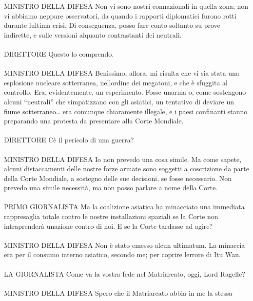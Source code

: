 MINISTRO DELLA DIFESA Non vi sono nostri connazionali in quella zona;
non vi abbiamo neppure osservatori, da quando i rapporti diplomatici
furono rotti durante l\textquotesingle ultima crisi. Di conseguenza,
posso fare conto soltanto su prove indirette, e sulle versioni alquanto
contrastanti dei neutrali.
\leavevmode\\
\leavevmode\\
DIRETTORE Questo lo comprendo.
\leavevmode\\
\leavevmode\\
MINISTRO DELLA DIFESA Benissimo, allora, mi risulta che vi sia stata una
esplosione nucleare sotterranea, nell\textquotesingle ordine dei
megatoni, e che è sfuggita al controllo. Era, evidentemente, un
esperimento. Fosse un\textquotesingle arma o, come sostengono alcuni
``neutrali'' che simpatizzano con gli asiatici, un tentativo di deviare
un fiume sotterraneo\ldots{} era comunque chiaramente illegale, e i
paesi confinanti stanno preparando una protesta da presentare alla Corte
Mondiale.
\leavevmode\\
\leavevmode\\
DIRETTORE C\textquotesingle è il pericolo di una guerra?
\leavevmode\\
\leavevmode\\
MINISTRO DELLA DIFESA Io non prevedo una cosa simile. Ma come sapete,
alcuni distaccamenti delle nostre forze armate sono soggetti a
coscrizione da parte della Corte Mondiale, a sostegno delle sue
decisioni, se fosse necessario. Non prevedo una simile necessità, ma non
posso parlare a nome della Corte.
\leavevmode\\
\leavevmode\\
PRIMO GIORNALISTA Ma la coalizione asiatica ha minacciato una immediata
rappresaglia totale contro le nostre installazioni spaziali se la Corte
non intraprenderà un\textquotesingle azione contro di noi. E se la Corte
tardasse ad agire?
\leavevmode\\
\leavevmode\\
MINISTRO DELLA DIFESA Non è stato emesso alcun ultimatum. La minaccia
era per il consumo interno asiatico, secondo me; per coprire
l\textquotesingle errore di Itu Wan.
\leavevmode\\
\leavevmode\\
LA GIORNALISTA Come va la vostra fede nel Matriarcato, oggi, Lord
Ragelle?
\leavevmode\\
\leavevmode\\
MINISTRO DELLA DIFESA Spero che il Matriarcato abbia in me la stessa
